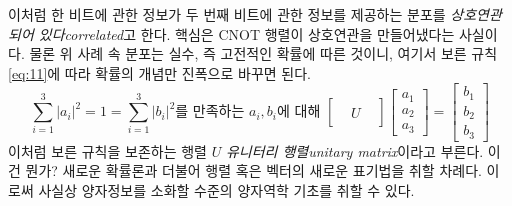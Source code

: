 \documentclass[a4paper,chapter,atbegshi]{oblivoir}
\begin{document}
이처럼 한 비트에 관한 정보가 두 번째 비트에 관한 정보를 제공하는 분포를
\emph{상호연관되어 있다\tiny correlated}고 한다. 핵심은 CNOT 행렬이 
상호연관을 만들어냈다는 사실이다. 물론 위 사례 속 분포는 실수, 즉 고전적인
확률에 따른 것이니, 여기서 보른 규칙 \ref{eq:11}에 따라 확률의 개념만 
진폭으로 바꾸면 된다. 
\begin{equation}\label{eq:15}
  \sum_{i=1}^3 |a_i|^2 = 1 = \sum_{i=1}^3 |b_i|^2\textrm{를 만족하는 $a_i,b_i$에 대해 }
  \begin{bmatrix}
    & & \\ & U & \\ & &
    \end{bmatrix}\begin{bmatrix}a_1\\a_2\\a_3\end{bmatrix}
    =\begin{bmatrix}b_1\\b_2\\b_3\end{bmatrix}
\end{equation}
이처럼 보른 규칙을 보존하는 행렬 $U$ \emph{유니터리 행렬\tiny unitary
matrix}이라고 부른다. 이건 뭔가? 새로운 확률론과 더불어 행렬 혹은 벡터의 
새로운 표기법을 취할 차례다. 이로써 사실상 양자정보를 소화할 수준의
양자역학 기초를 취할 수 있다. 
\end{document}
